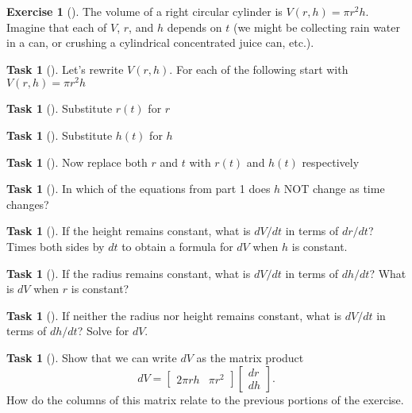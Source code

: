 \documentclass[10pt,]{book}
\theoremstyle{plain}
\theoremstyle{definition}
\theoremstyle{definition}
\theoremstyle{definition}
\theoremstyle{definition}
\newtheorem{exploration}[project]{Exercise}
\newtheorem{task}[project]{Task}
\theoremstyle{definition}
\numberwithin{equation}{section}
\newcommand{\amp}{&}
\begin{document}
\begin{exploration}[]\label{prob_differential_volume_of_a_cylinder}
The volume of a right circular cylinder is \(V(r,h)= \pi r^2 h\). Imagine that each of \(V\), \(r\), and \(h\) depends on \(t\) (we might be collecting rain water in a can, or crushing a cylindrical concentrated juice can, etc.).%
\begin{task}[]\label{task-263}
Let's rewrite \(V(r,h)\). For each of the following start with \(V(r,h)=\pi r^2 h\)%
\begin{task}[]\label{task-264}
Substitute \(r(t)\) for \(r\)%
\end{task}
\begin{task}[]\label{task-265}
Substitute \(h(t)\) for \(h\)%
\end{task}
\begin{task}[]\label{task-266}
Now replace both \(r\) and \(t\) with \(r(t)\) and \(h(t)\) respectively%
\end{task}
\end{task}
\begin{task}[]\label{task-267}
In which of the equations from part 1 does \(h\) NOT change as time changes?%
\end{task}
\begin{task}[]\label{task-268}
If the height remains constant, what is \(dV/dt\) in terms of \(dr/dt\)? Times both sides by \(dt\) to obtain a formula for \(dV\) when \(h\) is constant.%
\end{task}
\begin{task}[]\label{task-269}
If the radius remains constant, what is \(dV/dt\) in terms of \(dh/dt\)? What is \(dV\) when \(r\) is constant?%
\end{task}
\begin{task}[]\label{task-270}
If neither the radius nor height remains constant, what is \(dV/dt\) in terms of \(dh/dt\)? Solve for \(dV\).%
\end{task}
\begin{task}[]\label{task-271}
Show that we can write \(dV\) as the matrix product%
\begin{equation*}
dV = \begin{bmatrix}2\pi rh\amp  \pi r^2
\end{bmatrix} \begin{bmatrix}dr\\dh
\end{bmatrix} .
\end{equation*}
How do the columns of this matrix relate to the previous portions of the exercise.%
\end{task}
\end{exploration}
\end{document}
